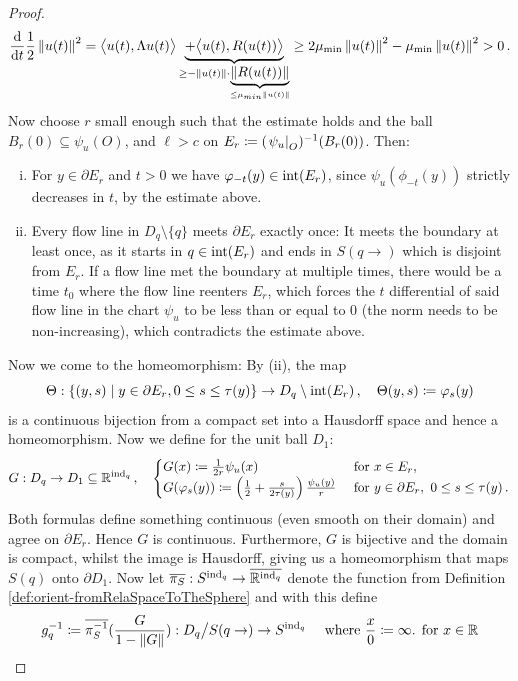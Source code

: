 \begin{proof}
\begin{equation*}
	\frac{\mathop{}\!\mathrm{d}}{\mathop{}\!\mathrm{d} t}\frac12\left\lVert u(t)\right\rVert^2=\big\langle u(t),\Lambda u(t)\big\rangle\underbrace{+\big\langle u(t),R(u(t))\big\rangle}_{\geq -\left\lVert u(t)\right\rVert\cdot \underbrace{\left\lVert R(u(t))\right\rVert}_{\leq \mu_{min}\left\lVert u(t)\right\rVert}}\geq 2\mu_{\min}\left\lVert u(t)\right\rVert^2-\mu_{\min}\left\lVert u(t)\right\rVert^2>0\,.
\end{equation*} 
Now choose $r$ small enough such that the estimate holds and the ball $B_r(0)\subseteq \psi_u(O)$, and $\ell>c$ on $E_r\coloneq (\left.\psi_u\right|_{O})^{-1}(B_r(0))$. Then:
\begin{enumerate}[(i)]
	\item For $y\in \partial E_r$ and $t>0$ we have $\varphi_{-t}(y)\in \operatorname{\mathrm{int}}(E_r)$, since $\psi_u(\phi_{-t}(y))$ strictly decreases in $t$, by the estimate above.
	\item Every flow line in  $D_q\setminus \{q\}$ meets $\partial E_r$ exactly once: It meets the boundary at least once, as it starts in $q\in \operatorname{\mathrm{int}}(E_r)$ and ends in $S(q\to)$ which is disjoint from $E_r$. If a flow line met the boundary at multiple times, there would be a time $t_0$ where the flow line reenters $E_r$, which forces the $t$ differential of said flow line in the chart $\psi_u$ to be less than or equal to $0$ (the norm needs to be non-increasing), which contradicts the estimate above.
\end{enumerate}

Now we come to the homeomorphism: By (ii), the map 
\begin{equation*}
	\Theta:\{(y,s)\mid y\in \partial E_r, 0\leq s \leq \tau(y)\}\to D_q\setminus \operatorname{\mathrm{int}}(E_r)\,,\quad \Theta(y,s)\coloneq \varphi_s(y)
\end{equation*}  is a continuous bijection from a compact set into a Hausdorff space and hence a homeomorphism. Now we define for the unit ball $D_1$:
\begin{align*}
	G:D_q\to D_1\subseteq \mathbb{R}^{\mathrm{ind}_q}\,, \quad 
	\begin{cases}
		G(x)\coloneq \frac{1}{2r}\psi_u(x) & \text{ for }x\in E_r,\\
		G(\varphi_s(y))\coloneq \left(\frac12 + \frac{s}{2 \tau(y)}\right) \frac{\psi_u(y)}{r}&\text{ for } y\in \partial E_r,~ 0\leq s\leq \tau(y)\,.
	\end{cases}
\end{align*}
Both formulas define something continuous (even smooth on their domain) and agree on $\partial E_r$. Hence $G$ is continuous. Furthermore, $G$ is bijective and the domain is compact, whilst the image is Hausdorff, giving us a homeomorphism that maps $S(q)$ onto $\partial D_1$. Now let $\overline{\pi_S}:S^{\mathrm{ind}_q}\to \overline{\mathbb{R}^{\mathrm{ind}_q}}$ denote the function from Definition \ref{def:orient-fromRelaSpaceToTheSphere} and with this define 
\begin{equation*}
	g_q^{-1}\coloneq \overline{\pi_S^{-1}}(\frac{G}{1-\left\lVert G\right\rVert}): D_q\big/S(q\to) \to S^{\mathrm{ind}_q}
	\quad \text{ where $\frac{x}{0}\coloneq \infty$. for $x\in \mathbb{R}$}
\end{equation*} 


\end{proof}
